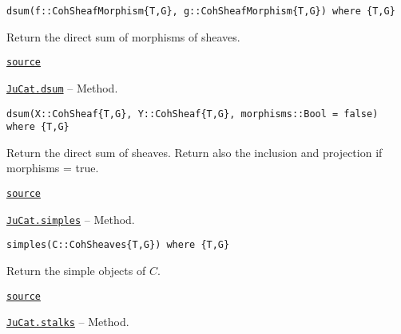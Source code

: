 \documentclass{memoir}
\begin{document}
\begin{adjustwidth}{2em}{0pt}


\begin{verbatim}
dsum(f::CohSheafMorphism{T,G}, g::CohSheafMorphism{T,G}) where {T,G}
\end{verbatim}

Return the direct sum of morphisms of sheaves.



\href{https://github.com/FabianMaeurer/JuCat.jl/blob/367390e2d003deec2ababa73caeab405e934bb35/src/structures/ConvolutionCategory/CoherentSheaves.jl#L154-L158}{\texttt{source}}


\end{adjustwidth}
\hypertarget{8802874031542181034}{} 
\hyperlink{8802874031542181034}{\texttt{JuCat.dsum}}  -- {Method.}

\begin{adjustwidth}{2em}{0pt}


\begin{verbatim}
dsum(X::CohSheaf{T,G}, Y::CohSheaf{T,G}, morphisms::Bool = false) where {T,G}
\end{verbatim}

Return the direct sum of sheaves. Return also the inclusion and projection if morphisms = true.



\href{https://github.com/FabianMaeurer/JuCat.jl/blob/367390e2d003deec2ababa73caeab405e934bb35/src/structures/ConvolutionCategory/CoherentSheaves.jl#L137-L142}{\texttt{source}}


\end{adjustwidth}
\hypertarget{8170827327284328945}{} 
\hyperlink{8170827327284328945}{\texttt{JuCat.simples}}  -- {Method.}

\begin{adjustwidth}{2em}{0pt}


\begin{verbatim}
simples(C::CohSheaves{T,G}) where {T,G}
\end{verbatim}

Return the simple objects of \(C\).



\href{https://github.com/FabianMaeurer/JuCat.jl/blob/367390e2d003deec2ababa73caeab405e934bb35/src/structures/ConvolutionCategory/CoherentSheaves.jl#L224-L228}{\texttt{source}}


\end{adjustwidth}
\hypertarget{11851872779302020562}{} 
\hyperlink{11851872779302020562}{\texttt{JuCat.stalks}}  -- {Method.}
\end{document}
